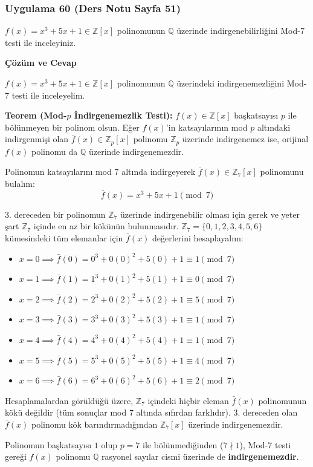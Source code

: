 \documentclass[11pt, a4paper]{article}
\newenvironment{cozum}{
    \vspace{0.5cm}
    \noindent\textcolor{green!60!black}{\faCheckCircle\enspace \textbf{\Large Çözüm ve Cevap}}\par\vspace{0.2cm}
}{}
\begin{document}
\newpage
\subsubsection{Uygulama 60 (Ders Notu Sayfa 51)}
\begin{sorubox}
$f(x)=x^3+5x+1 \in \mathbb{Z}[x]$ polinomunun $\mathbb{Q}$ üzerinde indirgenebilirliğini Mod-7 testi ile inceleyiniz.
\end{sorubox}
\begin{cozum}
$f(x) = x^{3} + 5x + 1 \in \mathbb{Z}[x]$ polinomunun $\mathbb{Q}$ üzerindeki indirgenemezliğini Mod-7 testi ile inceleyelim.

\textbf{Teorem (Mod-$p$ İndirgenemezlik Testi):} $f(x) \in \mathbb{Z}[x]$ başkatsayısı $p$ ile bölünmeyen bir polinom olsun. Eğer $f(x)$'in katsayılarının mod $p$ altındaki indirgenmişi olan $\bar{f}(x) \in \mathbb{Z}_p[x]$ polinomu $\mathbb{Z}_p$ üzerinde indirgenemez ise, orijinal $f(x)$ polinomu da $\mathbb{Q}$ üzerinde indirgenemezdir.

Polinomun katsayılarını mod 7 altında indirgeyerek $\bar{f}(x) \in \mathbb{Z}_{7}[x]$ polinomunu bulalım:
\[ \bar{f}(x) = x^{3} + 5x + 1 \pmod{7} \]

3. dereceden bir polinomun $\mathbb{Z}_{7}$ üzerinde indirgenebilir olması için gerek ve yeter şart $\mathbb{Z}_{7}$ içinde en az bir kökünün bulunmasıdır. $\mathbb{Z}_{7} = \{0, 1, 2, 3, 4, 5, 6\}$ kümesindeki tüm elemanlar için $\bar{f}(x)$ değerlerini hesaplayalım:
\begin{itemize}
    \item $x = 0 \implies \bar{f}(0) = 0^3 + 0(0)^2 + 5(0) + 1 \equiv 1 \pmod{7}$
    \item $x = 1 \implies \bar{f}(1) = 1^3 + 0(1)^2 + 5(1) + 1 \equiv 0 \pmod{7}$
    \item $x = 2 \implies \bar{f}(2) = 2^3 + 0(2)^2 + 5(2) + 1 \equiv 5 \pmod{7}$
    \item $x = 3 \implies \bar{f}(3) = 3^3 + 0(3)^2 + 5(3) + 1 \equiv 1 \pmod{7}$
    \item $x = 4 \implies \bar{f}(4) = 4^3 + 0(4)^2 + 5(4) + 1 \equiv 1 \pmod{7}$
    \item $x = 5 \implies \bar{f}(5) = 5^3 + 0(5)^2 + 5(5) + 1 \equiv 4 \pmod{7}$
    \item $x = 6 \implies \bar{f}(6) = 6^3 + 0(6)^2 + 5(6) + 1 \equiv 2 \pmod{7}$
\end{itemize}

Hesaplamalardan görüldüğü üzere, $\mathbb{Z}_{7}$ içindeki hiçbir eleman $\bar{f}(x)$ polinomunun kökü değildir (tüm sonuçlar mod 7 altında sıfırdan farklıdır). 3. dereceden olan $\bar{f}(x)$ polinomu kök barındırmadığından $\mathbb{Z}_{7}[x]$ üzerinde indirgenemezdir.

Polinomun başkatsayısı $1$ olup $p = 7$ ile bölünmediğinden ($7 \nmid 1$), Mod-7 testi gereği $f(x)$ polinomu $\mathbb{Q}$ rasyonel sayılar cismi üzerinde de \textbf{indirgenemezdir}.
\end{cozum}
\end{document}
